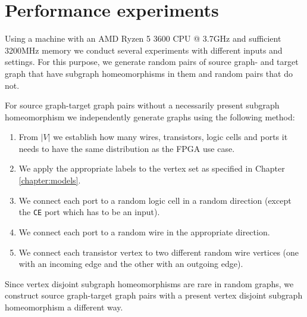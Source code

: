 \chapter{Performance experiments}
Using a machine with an AMD Ryzen 5 3600 CPU @ 3.7GHz and sufficient 3200MHz memory we conduct several experiments with different inputs and settings. For this purpose, we generate random pairs of source graph- and target graph that have subgraph homeomorphisms in them and random pairs that do not.

For source graph-target graph pairs without a necessarily present subgraph homeomorphism we independently generate graphs using the following method:

\begin{enumerate}
\item From $|V|$ we establish how many wires, transistors, logic cells and ports it needs to have the same distribution as the FPGA use case.
\item We apply the appropriate labels to the vertex set as specified in Chapter \ref{chapter:models}.
\item We connect each port to a random logic cell in a random direction (except the \texttt{CE} port which has to be an input).
\item We connect each port to a random wire in the appropriate direction.
\item We connect each transistor vertex to two different random wire vertices (one with an incoming edge and the other with an outgoing edge).
\end{enumerate}

Since vertex disjoint subgraph homeomorphisms are rare in random graphs, we construct source graph-target graph pairs with a present vertex disjoint subgraph homeomorphism a different way.

